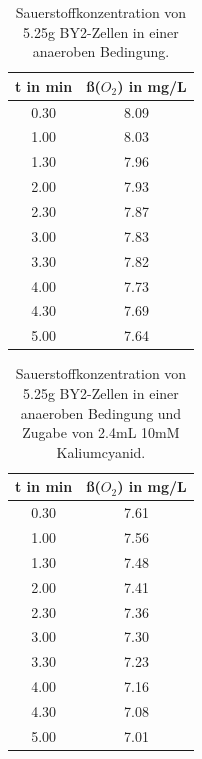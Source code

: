 \documentclass[10pt,a4paper]{article}
\begin{document}
	\begin{table}[H]
		\centering
		\caption{Sauerstoffkonzentration von 5.25g BY2-Zellen in einer anaeroben Bedingung.}
		\label{tab:O2 BY2 ohne KCN}
		\begin{tabular}{cc}
			\toprule
			t in min& ß($O_2$) in mg/L\\
			\midrule
			0.30 & 8.09\\
			1.00 & 8.03\\
			1.30 & 7.96\\
			2.00 & 7.93\\
			2.30 & 7.87 \\
			3.00 & 7.83 \\
			3.30 & 7.82 \\
			4.00 & 7.73\\
			4.30 & 7.69\\
			5.00 & 7.64 \\
			\bottomrule
		\end{tabular}
	\end{table}	
	
	\begin{table}[H]
		\centering
		\caption{Sauerstoffkonzentration von 5.25g BY2-Zellen in einer anaeroben Bedingung und Zugabe von 2.4mL 10mM Kaliumcyanid.}
		\label{tab:O2 BY2 mit KCN}
		\begin{tabular}{cc}
			\toprule
			t in min& ß($O_2$) in mg/L\\
			\midrule
			0.30 & 7.61\\
			1.00 & 7.56\\
			1.30 & 7.48\\
			2.00 & 7.41\\
			2.30 & 7.36 \\
			3.00 & 7.30 \\
			3.30 & 7.23 \\
			4.00 & 7.16\\
			4.30 & 7.08\\
			5.00 & 7.01 \\
			\bottomrule
		\end{tabular}
	\end{table}	
	
	
	
	
	
	\nocite{*}
	
	\newpage
	
	
\end{document}

